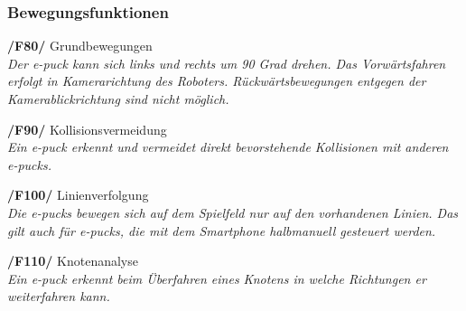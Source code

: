 \documentclass[10pt,a4paper]{article}
\begin{document}
			\subsubsection{Bewegungsfunktionen}
				\begin{list}{}{\leftmargin=1cm}
					\item[\textbf{/F80/}] Grundbewegungen
						\\ \textsl{Der e-puck kann sich links und rechts um 90 Grad drehen. Das Vorwärtsfahren erfolgt
							in Kamerarichtung des Roboters. Rückwärtsbewegungen entgegen der Kamerablickrichtung sind nicht möglich.}
					\item[\textbf{/F90/}] Kollisionsvermeidung
						\\ \textsl{Ein e-puck erkennt und vermeidet direkt bevorstehende Kollisionen mit anderen e-pucks.}							
					\item[\textbf{/F100/}] Linienverfolgung
						\\ \textsl{Die e-pucks bewegen sich auf dem Spielfeld nur auf den vorhandenen Linien. Das gilt auch für e-pucks,
						die mit dem Smartphone halbmanuell gesteuert werden.}
					\item[\textbf{/F110/}] Knotenanalyse
						\\ \textsl{Ein e-puck erkennt beim Überfahren eines Knotens in welche Richtungen er weiterfahren kann.}
				\end{list}
\end{document}
